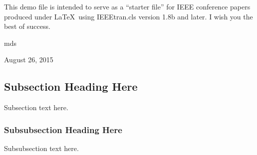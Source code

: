 \documentclass[conference]{IEEEtran}
\begin{document}
This demo file is intended to serve as a ``starter file''
for IEEE conference papers produced under \LaTeX\ using
IEEEtran.cls version 1.8b and later.
I wish you the best of success.

\hfill mds
 
\hfill August 26, 2015

\subsection{Subsection Heading Here}
Subsection text here.


\subsubsection{Subsubsection Heading Here}
Subsubsection text here.


%
%

\end{document}
